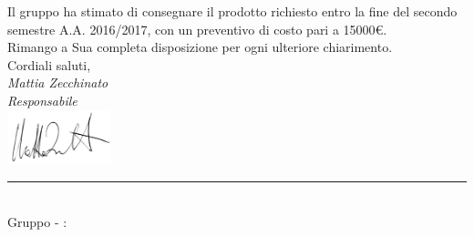 \begin{titlepage}
\begin{large}
	Il gruppo \GroupName{} ha stimato di consegnare il prodotto richiesto entro la fine del secondo semestre A.A. 2016/2017, con un preventivo di costo pari a 15000€.\\
	
	Rimango a Sua completa disposizione per ogni ulteriore chiarimento. \\
	
	Cordiali saluti,\\
	
	\emph{Mattia Zecchinato} \\
	\emph{Responsabile \GroupName{}} \\
	\includegraphics[width=3cm]{../../firme/MZ.png}
	
	\end{large}
	
	\vspace{1cm} 
	\begin{center}
		\rule{13cm}{0,03cm} \\
		Gruppo \GroupName{} - \email: \GroupEmail{}
	\end{center} 
	
	
	\end{titlepage}
  
 \restoregeometry

